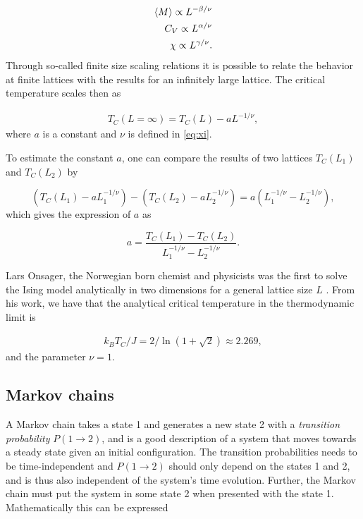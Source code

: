 \documentclass[../main.tex]{subfiles}
\begin{document}
\begin{align}
\begin{split}
    \braket{M}\propto L^{-\beta/\nu} \\
    C_V\propto L^{\alpha/\nu} \\
    \chi \propto L^{\gamma/\nu}. 
\end{split}
\end{align} Through so-called finite size scaling relations it is possible to relate the behavior at finite lattices with the results for an infinitely large lattice. The critical temperature scales then as

\begin{align}\label{eq:critical_temp}
    T_C(L=\infty)=T_C(L)-aL^{-1/\nu},
\end{align} where $a$ is a constant and $\nu$ is defined in \cref{eq:xi}. 

To estimate the constant $a$, one can compare the results of two lattices $T_C(L_1)$ and $T_C(L_2)$ by 

\begin{equation}
    (T_C(L_1)-aL_1^{-1/\nu}) - (T_C(L_2)-aL_2^{-1/\nu}) = a(L_1^{-1/\nu} - L_2^{-1/\nu}),
\end{equation}
which gives the expression of $a$ as

\begin{equation}
    a = \frac{T_C(L_1) - T_C(L_2)}{L_1^{-1/\nu} - L_2^{-1/\nu}}.
\end{equation}\label{eq:a}


Lars Onsager, the Norwegian born chemist and physicists was the first to solve the Ising model analytically in two dimensions for a general lattice size $L$ \cite{Onsager1944}. From his work, we have that the analytical critical temperature in the thermodynamic limit is

\begin{align}
    k_BT_C/J=2/\ln(1+\sqrt{2})\approx2.269,
\end{align} and the parameter $\nu=1$.

\subsection{Markov chains}
A Markov chain takes a state 1 and generates a new state 2 with a \textit{transition probability} \ensuremath{P(1\rightarrow2)}, and is a good description of a system that moves towards a steady state given an initial configuration. The transition probabilities needs to be time-independent and $P(1\rightarrow2)$ should only depend on the states 1 and 2, and is thus also independent of the system's time evolution. Further, the Markov chain must put the system in some state 2 when presented with the state 1. Mathematically this can be expressed 
\end{document}
